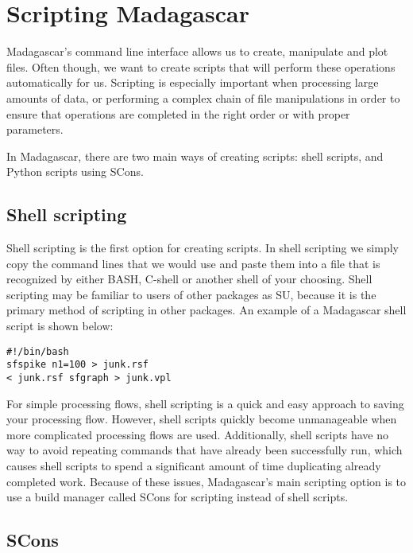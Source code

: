 \section{Scripting Madagascar}

Madagascar's command line interface allows us to create, manipulate and plot files.  Often though, we want to create scripts that will perform these operations automatically for us.  Scripting is especially important when processing large amounts of data, or performing a complex chain of file manipulations in order to ensure that operations are completed in the right order or with proper parameters.  

In Madagascar, there are two main ways of creating scripts: shell scripts, and Python scripts using SCons.  

\subsection{Shell scripting}

Shell scripting is the first option for creating scripts.  In shell scripting we simply copy the command lines that we would use and paste them into a file that is recognized by either BASH, C-shell or another shell of your choosing.  Shell scripting may be familiar to users of other packages as SU, because it is the primary method of scripting in other packages.  An example of a Madagascar shell script is shown below:

\begin{verbatim}
#!/bin/bash
sfspike n1=100 > junk.rsf
< junk.rsf sfgraph > junk.vpl
\end{verbatim}

For simple processing flows, shell scripting is a quick and easy approach to saving your processing flow.  However, shell scripts quickly become unmanageable when more complicated processing flows are used.  Additionally, shell scripts have no way to avoid repeating commands that have already been successfully run, which causes shell scripts to spend a significant amount of time duplicating already completed work.  Because of these issues, Madagascar's main scripting option is to use a build manager called SCons for scripting instead of shell scripts.

\subsection{SCons}

